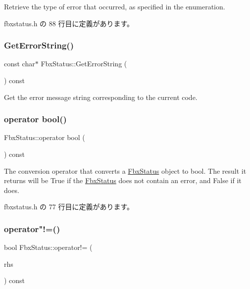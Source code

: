 Retrieve the type of error that occurred, as specified in the enumeration. 



 fbxstatus.\+h の 88 行目に定義があります。

\mbox{\label{class_fbx_status_aa36b462a6c63105538c483518415fb66}} 
\subsubsection{\texorpdfstring{Get\+Error\+String()}{GetErrorString()}}
{\footnotesize\ttfamily const char$\ast$ Fbx\+Status\+::\+Get\+Error\+String (\begin{DoxyParamCaption}{ }\end{DoxyParamCaption}) const}



Get the error message string corresponding to the current code. 

\mbox{\label{class_fbx_status_af364552fc78b2b02f09bc7dcccbbbe92}} 
\subsubsection{\texorpdfstring{operator bool()}{operator bool()}}
{\footnotesize\ttfamily Fbx\+Status\+::operator bool (\begin{DoxyParamCaption}{ }\end{DoxyParamCaption}) const\hspace{0.3cm}{\ttfamily [inline]}}

The conversion operator that converts a \hyperlink{class_fbx_status}{Fbx\+Status} object to bool. The result it returns will be {\ttfamily True} if the \hyperlink{class_fbx_status}{Fbx\+Status} does not contain an error, and {\ttfamily False} if it does. 

 fbxstatus.\+h の 77 行目に定義があります。

\mbox{\label{class_fbx_status_a832f10e5d0469a191a0cd845c60525b3}} 
\subsubsection{\texorpdfstring{operator"!=()}{operator!=()}\hspace{0.1cm}{\footnotesize\ttfamily [1/2]}}
{\footnotesize\ttfamily bool Fbx\+Status\+::operator!= (\begin{DoxyParamCaption}\item[{const \hyperlink{class_fbx_status}{Fbx\+Status} \&}]{rhs }\end{DoxyParamCaption}) const\hspace{0.3cm}{\ttfamily [inline]}}

